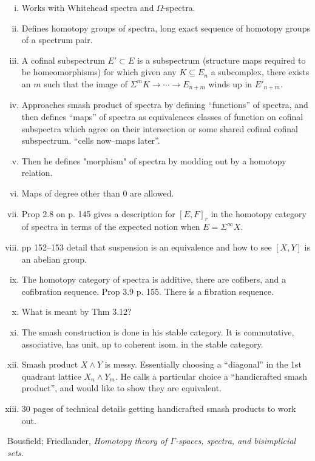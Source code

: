 \documentclass{article}%
\begin{document}
\begin{enumerate}[i. ]
\item Works with Whitehead spectra and $\Omega$-spectra.
\item Defines homotopy groups of spectra, long exact sequence of
  homotopy groups of a spectrum pair.
\item A cofinal subspectrum $E' \subset E$ is a subspectrum
  (structure maps required to be homeomorphisms) for which given any
  $K\subseteq E_n$ a subcomplex, there exists an $m$ such that the
  image of $\Sigma^m K \rightarrow \cdots \rightarrow E_{n+m}$ winds
  up in $E'_{n+m}$.
\item Approaches smash product of spectra by defining ``functions'' of
  spectra, and then defines ``maps'' of spectra as equivalences classes
  of function on cofinal subspectra which agree on their intersection
  or some shared cofinal cofinal subspectrum. ``cells now--maps
  later''. 
\item Then he defines "morphism" of spectra by modding out by a
  homotopy relation.
\item Maps of degree other than 0 are allowed.
\item Prop 2.8 on p. 145 gives a description for $[E,F]_r$ in the
  homotopy category of spectra in terms of the expected notion when
  $E=\Sigma^{\infty}X$.
\item pp 152--153 detail that suspension is an equivalence and how to
  see $[X,Y]$ is an abelian group.
\item The homotopy category of spectra is additive, there are
  cofibers, and a cofibration sequence. Prop 3.9 p. 155. There is a
  fibration sequence.
\item What is meant by Thm 3.12? 
\item The smash construction is done in his stable category. It is
  commutative, associative, has unit, up to coherent isom. in the
  stable category.
\item Smash product $X\wedge Y$ is messy. Essentially choosing a
  ``diagonal'' in the 1st quadrant lattice $X_n \wedge Y_m$. He calls a
  particular choice a ``handicrafted smash product'', and would like to
  show they are equivalent.
\item 30 pages of technical details getting handicrafted smash
  products to work out.
\end{enumerate}

Bousfield; Friedlander, {\it Homotopy theory of $\Gamma$-spaces,
  spectra, and bisimplicial sets.}
\end{document}
